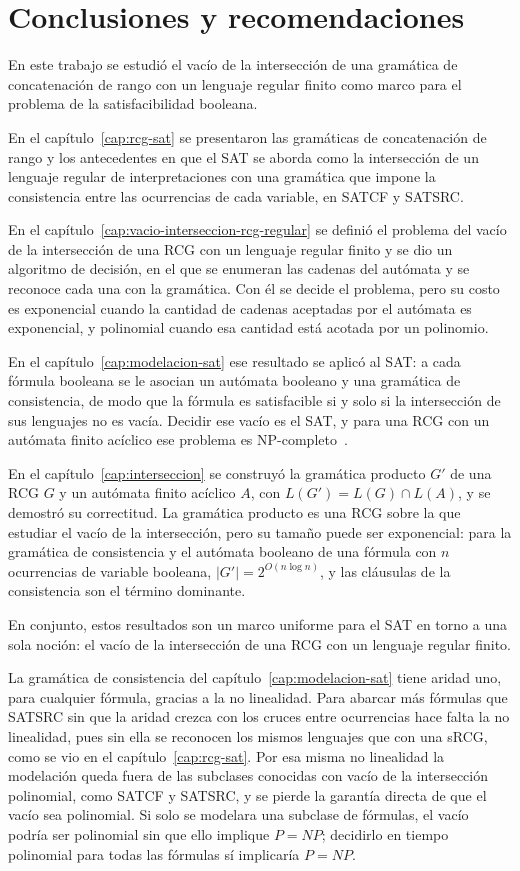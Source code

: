 
\chapter*{Conclusiones y recomendaciones}

En este trabajo se estudió el vacío de la intersección de una gramática
de concatenación de rango con un lenguaje regular finito como marco para
el problema de la satisfacibilidad booleana.

En el capítulo~\ref{cap:rcg-sat} se presentaron las gramáticas de
concatenación de rango y los antecedentes en que el SAT se aborda como
la intersección de un lenguaje regular de interpretaciones con una
gramática que impone la consistencia entre las ocurrencias de cada
variable, en SATCF y SATSRC.

En el capítulo~\ref{cap:vacio-interseccion-rcg-regular} se definió el
problema del vacío de la intersección de una RCG con un lenguaje regular
finito y se dio un algoritmo de decisión, en el que se enumeran las
cadenas del autómata y se reconoce cada una con la gramática. Con él se
decide el problema, pero su costo es exponencial cuando la cantidad de
cadenas aceptadas por el autómata es exponencial, y polinomial cuando esa
cantidad está acotada por un polinomio.

En el capítulo~\ref{cap:modelacion-sat} ese resultado se aplicó al SAT: a
cada fórmula booleana se le asocian un autómata booleano y una gramática
de consistencia, de modo que la fórmula es satisfacible si y solo si la
intersección de sus lenguajes no es vacía. Decidir ese vacío es el SAT,
y para una RCG con un autómata finito acíclico ese problema es
NP-completo~\cite{bertsch2001rcg}.

En el capítulo~\ref{cap:interseccion} se construyó la gramática producto
$G'$ de una RCG $G$ y un autómata finito acíclico $A$, con
$L(G') = L(G) \cap L(A)$, y se demostró su correctitud. La gramática
producto es una RCG sobre la que estudiar el vacío de la intersección,
pero su tamaño puede ser exponencial: para la gramática de consistencia y
el autómata booleano de una fórmula con $n$ ocurrencias de variable
booleana, $|G'| = 2^{O(n\log n)}$, y las cláusulas de la consistencia son
el término dominante.

En conjunto, estos resultados son un marco uniforme para el SAT en torno
a una sola noción: el vacío de la intersección de una RCG con un lenguaje
regular finito.

La gramática de consistencia del capítulo~\ref{cap:modelacion-sat} tiene
aridad uno, para cualquier fórmula, gracias a la no linealidad. Para
abarcar más fórmulas que SATSRC sin que
la aridad crezca con los cruces entre ocurrencias hace falta la no
linealidad, pues sin ella se reconocen los mismos lenguajes que con una
sRCG, como se vio en el capítulo~\ref{cap:rcg-sat}. Por esa misma no
linealidad la modelación queda fuera de las subclases conocidas con vacío
de la intersección polinomial, como SATCF y SATSRC, y se pierde la
garantía directa de que el vacío sea polinomial. Si solo se modelara una subclase
de fórmulas, el vacío podría ser polinomial sin que ello implique
$P = NP$; decidirlo en tiempo polinomial para todas las fórmulas sí
implicaría $P = NP$.

